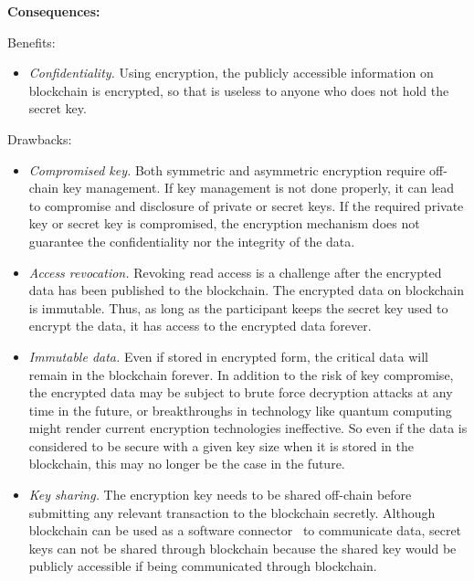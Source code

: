 

\vspace{0.5em}\noindent \textbf{Consequences:} 

Benefits:
\begin{itemize}
  \item \textit{Confidentiality.} Using encryption, the publicly accessible information on blockchain is encrypted, so that is useless to anyone who does not hold the secret key. 
\end{itemize}

Drawbacks: 
\begin{itemize}
  \item \textit{Compromised key.} Both symmetric and asymmetric encryption require off-chain key management. If key management is not done properly, it can lead to compromise and disclosure of private or secret keys. If the required private key or secret key is compromised, the encryption mechanism does not guarantee the confidentiality nor the integrity of the data. %
  \item \textit{Access revocation.} Revoking read access is a challenge after the encrypted data has been published to the blockchain. The encrypted data on blockchain is immutable. Thus, as long as the participant keeps the secret key used to encrypt the data, it has access to the encrypted data forever. 
  \item \textit{Immutable data.} Even if stored in encrypted form, the critical data will remain in the blockchain forever. In addition to the risk of key compromise, the encrypted data may be subject to brute force decryption attacks at any time in the future, or breakthroughs in technology like quantum computing might render current encryption technologies ineffective. So even if the data is considered to be secure with a given key size when it is stored in the blockchain, this may no longer be the case in the future.
  \item \textit{Key sharing.} The encryption key needs to be shared off-chain before submitting any relevant transaction to the blockchain secretly. Although blockchain can be used as a software connector~\cite{sherry2016} to communicate data, secret keys can not be shared through blockchain because the shared key would be publicly accessible if being communicated through blockchain.
\end{itemize}

